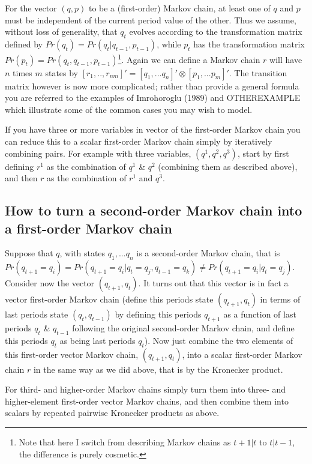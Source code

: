 For the vector $(q,p)$ to be a (first-order) Markov chain, at least one of $q$ and $p$ must be independent of the current period value of the other. Thus 
we assume, without loss of generality, that $q_t$ evolves according to the transformation matrix defined by $Pr(q_t)=Pr(q_t | q_{t-1},p_{t-1})$, while $p_t$ 
has the transformation matrix $Pr(p_t)=Pr(q_t, q_{t-1}, p_{t-1})$\footnote{Note that here I switch from describing Markov chains as $t+1 |t$ to $t|t-1$, the
difference is purely cosmetic.}. Again we can define a Markov chain $r$ will have $n$ times $m$ states by $[r_1,..,r_{nm}]'=[q_1,...q_n]'\otimes[p_1,...p_m]'$.
The transition matrix however is now more complicated; rather than provide a general formula you are referred to the examples of Imrohoroglu (1989) and
OTHEREXAMPLE which illustrate some of the common cases you may wish to model.

If you have three or more variables in vector of the first-order Markov chain you can reduce this to a scalar first-order Markov chain simply by iteratively
combining pairs. For example with three variables, $(q^1, q^2, q^3)$, start by first defining $r^1$ as the combination of $q^1$ \& $q^2$ (combining them as
described above), and then $r$ as the combination of $r^1$ and $q^3$.


\subsection{How to turn a second-order Markov chain into a first-order Markov chain}
Suppose that $q$, with states $q_1,...q_n$ is a second-order Markov chain, that is $Pr(q_{t+1}=q_i)=Pr(q_{t+1}=q_i|q_t=q_j, q_{t-1}=q_k)
\neq Pr(q_{t+1}=q_i|q_t=q_j)$. Consider now the vector $(q_{t+1}, q_t)$. It turns out that this vector is in fact a vector first-order Markov
chain (define this periods state $(q_{t+1}, q_t)$ in terms of last periods state $(q_t,q_{t-1})$ by defining this periods $q_{t+1}$ as a function of
last periods $q_t$ \& $q_{t-1}$ following the original second-order Markov chain, and define this periods $q_t$ as being last periods $q_t$). Now just
combine the two elements of this first-order vector Markov chain, $(q_{t+1}, q_t)$, into a scalar first-order Markov chain $r$ in the same way as we
did above, that is by the Kronecker product.

For third- and higher-order Markov chains simply turn them into three- and higher-element first-order vector Markov chains, and then combine them 
into scalars by repeated pairwise Kronecker products as above. 
